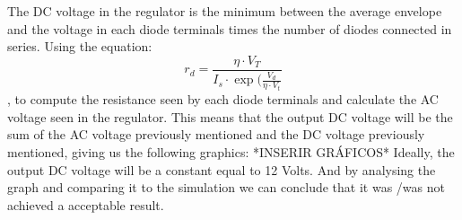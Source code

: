 The DC voltage in the regulator is the minimum between the average envelope and the voltage in each diode terminals times the number of diodes connected in series.
Using the equation:
\begin{equation}
 r_d= \frac {\eta \cdot V_T}{ I_s \cdot \exp(\frac{V_d}{\eta \cdot V_t}}
  \label{eq: rd}
\end{equation}
, to compute the resistance seen by each diode terminals and calculate the AC voltage seen in the regulator.
This means that the output DC voltage will be the sum of the AC voltage previously mentioned and the DC voltage previously mentioned, giving us the following graphics:
*INSERIR GRÁFICOS*
Ideally, the output DC voltage will be a constant equal to 12 Volts. And by analysing the graph and comparing it to the simulation we can conclude that it was /was not achieved a acceptable result.
